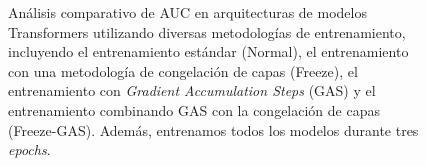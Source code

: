 \clearpage

\begin{figure}[H]
	\centering
	

	\caption[Comparación del AUC de modelos Transformers entrenados con 3 \textit{epochs}]{Análisis comparativo de AUC en arquitecturas de modelos Transformers utilizando diversas metodologías de entrenamiento, incluyendo el entrenamiento estándar (Normal), el entrenamiento con una metodología de congelación de capas (Freeze), el entrenamiento con \textit{Gradient Accumulation Steps} (GAS) y el entrenamiento combinando GAS con la congelación de capas (Freeze-GAS). Además, entrenamos todos los modelos durante tres \textit{epochs}.}
	\label{fig:comparison_3_3pochs}
\end{figure}

